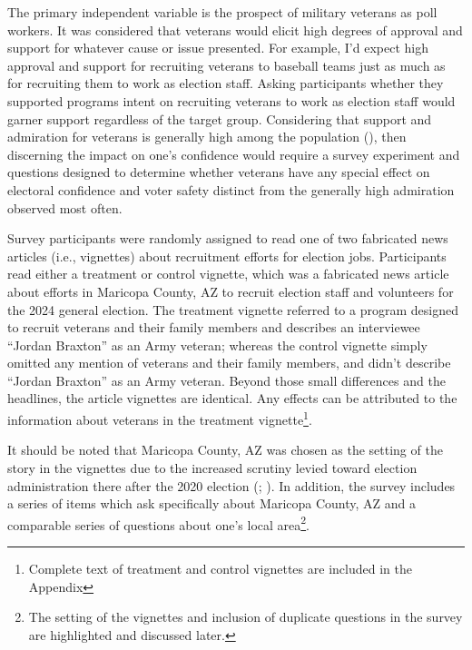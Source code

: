\documentclass[
  11pt,
  a4paper,
]{scrartcl}
\begin{document}
The primary independent variable is the prospect of military veterans as
poll workers. It was considered that veterans would elicit high degrees
of approval and support for whatever cause or issue presented. For
example, I'd expect high approval and support for recruiting veterans to
baseball teams just as much as for recruiting them to work as election
staff. Asking participants whether they supported programs intent on
recruiting veterans to work as election staff would garner support
regardless of the target group. Considering that support and admiration
for veterans is generally high among the population
(), then
discerning the impact on one's confidence would require a survey
experiment and questions designed to determine whether veterans have any
special effect on electoral confidence and voter safety distinct from
the generally high admiration observed most often.

Survey participants were randomly assigned to read one of two fabricated
news articles (i.e., vignettes) about recruitment efforts for election
jobs. Participants read either a treatment or control vignette, which
was a fabricated news article about efforts in Maricopa County, AZ to
recruit election staff and volunteers for the 2024 general election. The
treatment vignette referred to a program designed to recruit veterans
and their family members and describes an interviewee ``Jordan Braxton''
as an Army veteran; whereas the control vignette simply omitted any
mention of veterans and their family members, and didn't describe
``Jordan Braxton'' as an Army veteran. Beyond those small differences
and the headlines, the article vignettes are identical. Any effects can
be attributed to the information about veterans in the treatment
vignette\footnote{Complete text of treatment and control vignettes are
  included in the Appendix}.

It should be noted that Maricopa County, AZ was chosen as the setting of
the story in the vignettes due to the increased scrutiny levied toward
election administration there after the 2020 election
(;
). In addition, the survey includes a series
of items which ask specifically about Maricopa County, AZ and a
comparable series of questions about one's local area\footnote{The
  setting of the vignettes and inclusion of duplicate questions in the
  survey are highlighted and discussed later.}.
\end{document}
